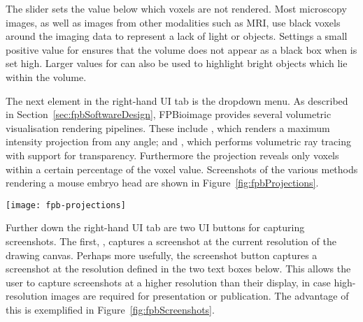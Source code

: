 The  slider sets the value below which voxels are not rendered.
Most microscopy images, as well as images from other modalities such as MRI, use black voxels around the imaging data to represent a lack of light or objects.
Settings a small positive value for  ensures that the volume does not appear as a black box when  is set high.
Larger values for  can also be used to highlight bright objects which lie within the volume.

The next element in the right-hand UI tab is the  dropdown menu.
As described in Section~\ref{sec:fpbSoftwareDesign}, FPBioimage provides several volumetric visualisation rendering pipelines.
These include , which renders a maximum intensity projection from any angle; and , which performs volumetric ray tracing with support for transparency.
Furthermore the  projection reveals only voxels within a certain percentage of the  voxel value.
Screenshots of the various  methods rendering a mouse embryo head are shown in Figure~\ref{fig:fpbProjections}.

\begin{sidewaysfigure}[p]
\centering
\texttt{[image: fpb-projections]}
\caption[FPBioimage: Four projection methods highlight different details in volumetric data]{First Person Bioimage offers 4 different types of volumetric projection. (a) shows a maximum intensity projection, (b) a volumetric ray marching projection, (c) a variation on the volumetric ray marching projection, with alpha calculated from RGB voxel values, and (d) an iso-surface projection. Data is of a mouse embryo head captured with `OPTiSPIM', provided by Jim Swoger~\cite{mayer2014optispim}. }
\label{fig:fpbProjections}
\end{sidewaysfigure}

Further down the right-hand UI tab are two UI buttons for capturing screenshots.
The first, , captures a screenshot at the current resolution of the drawing canvas.
Perhaps more usefully, the  screenshot button captures a screenshot at the resolution defined in the two text boxes below.
This allows the user to capture screenshots at a higher resolution than their display, in case high-resolution images are required for presentation or publication.
The advantage of this is exemplified in Figure~\ref{fig:fpbScreenshots}.

